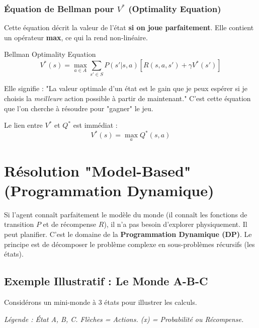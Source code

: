 \documentclass[a4paper,12pt]{report}
\begin{document}
\subsection{Équation de Bellman pour $V^*$ (Optimality Equation)}
Cette équation décrit la valeur de l'état \textbf{si on joue parfaitement}. Elle contient un opérateur \textbf{max}, ce qui la rend non-linéaire.
\begin{mathdef}{Bellman Optimality Equation}
\[ V^*(s) = \max_{a \in A} \sum_{s' \in S} P(s'|s,a) \left[ R(s,a,s') + \gamma V^*(s') \right] \]
\end{mathdef}
Elle signifie : "La valeur optimale d'un état est le gain que je peux espérer si je choisis la \textit{meilleure} action possible à partir de maintenant."
C'est cette équation que l'on cherche à résoudre pour "gagner" le jeu.

Le lien entre $V^*$ et $Q^*$ est immédiat :
\[ V^*(s) = \max_{a} Q^*(s,a) \]

\chapter{Résolution "Model-Based" (Programmation Dynamique)}

Si l'agent connaît parfaitement le modèle du monde (il connaît les fonctions de transition $P$ et de récompense $R$), il n'a pas besoin d'explorer physiquement. Il peut planifier. C'est le domaine de la \textbf{Programmation Dynamique (DP)}.
Le principe est de décomposer le problème complexe en sous-problèmes récursifs (les états).

\section{Exemple Illustratif : Le Monde A-B-C}
Considérons un mini-monde à 3 états pour illustrer les calculs.
\begin{center}
\end{center}
\textit{Légende : État A, B, C. Flèches = Actions. (x) = Probabilité ou Récompense.}
\end{document}
